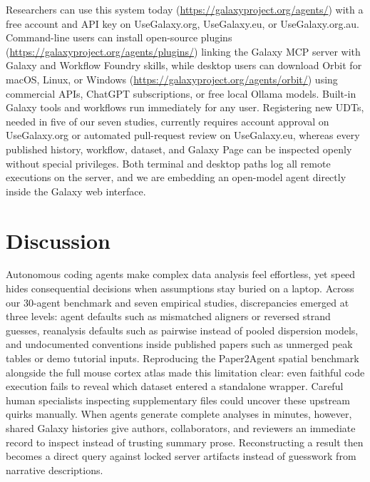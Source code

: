 \documentclass[11pt,letterpaper]{article}
\newcommand{\tool}[1]{\textsf{#1}}
\begin{document}
Researchers can use this system today (\url{https://galaxyproject.org/agents/}) with a free account and API key on UseGalaxy.org, UseGalaxy.eu, or UseGalaxy.org.au. Command-line users can install open-source plugins (\url{https://galaxyproject.org/agents/plugins/}) linking the Galaxy MCP server with Galaxy and \tool{Workflow Foundry} skills, while desktop users can download \tool{Orbit} for macOS, Linux, or Windows (\url{https://galaxyproject.org/agents/orbit/}) using commercial APIs, ChatGPT subscriptions, or free local Ollama models. Built-in Galaxy tools and workflows run immediately for any user. Registering new UDTs, needed in five of our seven studies, currently requires account approval on UseGalaxy.org or automated pull-request review on UseGalaxy.eu, whereas every published history, workflow, dataset, and Galaxy Page can be inspected openly without special privileges. Both terminal and desktop paths log all remote executions on the server, and we are embedding an open-model agent directly inside the Galaxy web interface.

\clearpage
\section{Discussion}

Autonomous coding agents make complex data analysis feel effortless, yet speed hides consequential decisions when assumptions stay buried on a laptop. Across our 30-agent benchmark and seven empirical studies, discrepancies emerged at three levels: agent defaults such as mismatched aligners or reversed strand guesses, reanalysis defaults such as pairwise instead of pooled dispersion models, and undocumented conventions inside published papers such as unmerged peak tables or demo tutorial inputs. Reproducing the \tool{Paper2Agent} spatial benchmark \cite{miao2026} alongside the full mouse cortex atlas \cite{sun2024} made this limitation clear: even faithful code execution fails to reveal which dataset entered a standalone wrapper. Careful human specialists inspecting supplementary files could uncover these upstream quirks manually. When agents generate complete analyses in minutes, however, shared Galaxy histories give authors, collaborators, and reviewers an immediate record to inspect instead of trusting summary prose. Reconstructing a result then becomes a direct query against locked server artifacts instead of guesswork from narrative descriptions.
\end{document}
